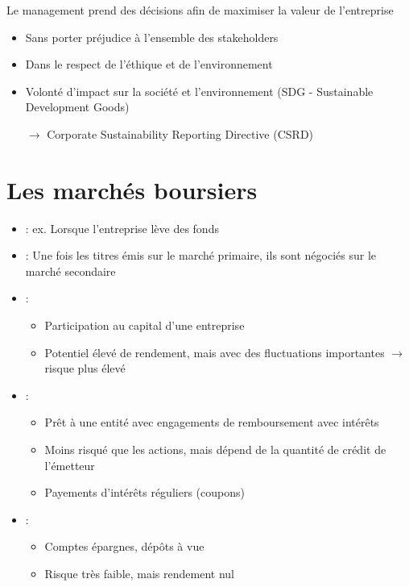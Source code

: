 Le management prend des décisions afin de maximiser la valeur de l'entreprise
\begin{itemize}
    \item Sans porter préjudice à l'ensemble des stakeholders
    \item Dans le respect de l'éthique et de l'environnement
    \item Volonté d'impact sur la société et l’environnement (SDG - Sustainable Development Goods)
    \item[$\rightarrow$] Corporate Sustainability Reporting Directive (CSRD)
\end{itemize}

\section{Les marchés boursiers}

\begin{itemize}
    \item {} : ex. Lorsque l'entreprise lève des fonds
    \item {} : Une fois les titres émis sur le marché primaire, ils sont négociés sur le marché secondaire
    \item {} :
    \begin{itemize}
        \item Participation au capital d'une entreprise
        \item Potentiel élevé de rendement, mais avec des fluctuations importantes $\rightarrow$ risque plus élevé
    \end{itemize}
    \item {} :
    \begin{itemize}
        \item Prêt à une entité avec engagements de remboursement avec intérêts
        \item Moins risqué que les actions, mais dépend de la quantité de crédit de l'émetteur
        \item Payements d'intérêts réguliers (coupons)
    \end{itemize}
    \item {} : 
    \begin{itemize}
        \item Comptes épargnes, dépôts à vue
        \item Risque très faible, mais rendement nul
    \end{itemize}
\end{itemize}

